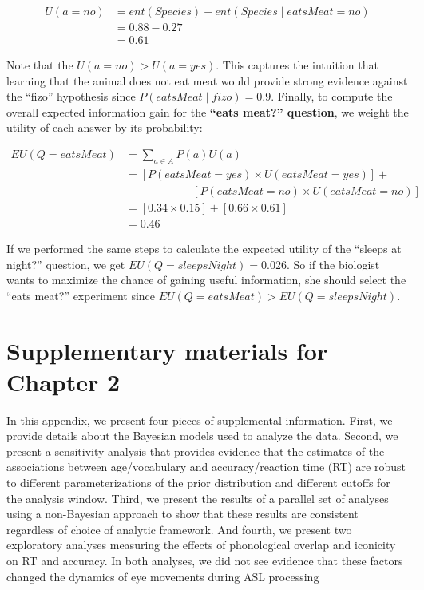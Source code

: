 \documentclass[oneside]{report}
\begin{document}
\[ 
\begin{aligned}
U(a = no) &= ent(Species) - ent(Species \mid eatsMeat = no)\\
&= 0.88 - 0.27 \\
&= 0.61
\end{aligned}
\]

\noindent Note that the \(U(a = no) > U(a = yes)\). This captures the
intuition that learning that the animal does not eat meat would provide
strong evidence against the ``fizo'' hypothesis since
\(P(eatsMeat \mid fizo) = 0.9\). Finally, to compute the overall
expected information gain for the \textbf{``eats meat?'' question}, we
weight the utility of each answer by its probability:

\[
\begin{aligned}
EU(Q = eatsMeat) &= \sum_{a\in A}{P(a)U(a)} \\
&= [P(eatsMeat = yes) \times U(eatsMeat = yes)] + \\& \qquad \qquad \qquad [P(eatsMeat = no) \times U(eatsMeat = no)]\\
&= [0.34 \times 0.15] + [0.66 \times 0.61]\\
&= 0.46
\end{aligned}
\]

If we performed the same steps to calculate the expected utility of the
``sleeps at night?'' question, we get \(EU(Q = sleepsNight) = 0.026\).
So if the biologist wants to maximize the chance of gaining useful
information, she should select the ``eats meat?'' experiment since
\(EU(Q = eatsMeat) > EU(Q = sleepsNight)\).

\hypertarget{supplementary-materials-for-chapter-2}{%
\chapter{Supplementary materials for Chapter
2}\label{supplementary-materials-for-chapter-2}}

In this appendix, we present four pieces of supplemental information.
First, we provide details about the Bayesian models used to analyze the
data. Second, we present a sensitivity analysis that provides evidence
that the estimates of the associations between age/vocabulary and
accuracy/reaction time (RT) are robust to different parameterizations of
the prior distribution and different cutoffs for the analysis window.
Third, we present the results of a parallel set of analyses using a
non-Bayesian approach to show that these results are consistent
regardless of choice of analytic framework. And fourth, we present two
exploratory analyses measuring the effects of phonological overlap and
iconicity on RT and accuracy. In both analyses, we did not see evidence
that these factors changed the dynamics of eye movements during ASL
processing
\end{document}
